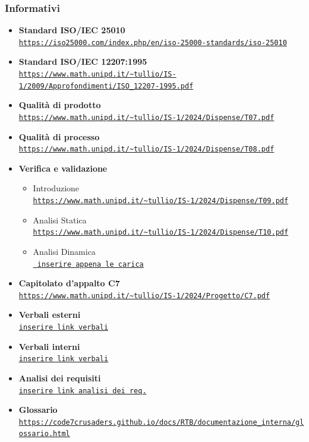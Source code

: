 \documentclass{article}
\begin{document}
\subsubsection{Informativi}
\begin{itemize}
    \item \textbf{Standard ISO/IEC 25010} \\ \texttt{\url{https://iso25000.com/index.php/en/iso-25000-standards/iso-25010}}
    \item \textbf{Standard ISO/IEC 12207:1995} \\ \texttt{\url{https://www.math.unipd.it/~tullio/IS-1/2009/Approfondimenti/ISO_12207-1995.pdf}}
    \item \textbf{Qualità di prodotto} \\ \texttt{\url{https://www.math.unipd.it/~tullio/IS-1/2024/Dispense/T07.pdf}}
    \item \textbf{Qualità di processo} \\ \texttt{\url{https://www.math.unipd.it/~tullio/IS-1/2024/Dispense/T08.pdf}}
    \item \textbf{Verifica e validazione}
    \begin{itemize}
        \item Introduzione \\ \texttt{\url{https://www.math.unipd.it/~tullio/IS-1/2024/Dispense/T09.pdf}}
        \item Analisi Statica \\ \texttt{\url{https://www.math.unipd.it/~tullio/IS-1/2024/Dispense/T10.pdf}}
        \item Analisi Dinamica \\ \texttt{\url{ inserire appena le carica}}
    \end{itemize}
    \item \textbf{Capitolato d'appalto C7} \\ \texttt{\url{https://www.math.unipd.it/~tullio/IS-1/2024/Progetto/C7.pdf}}
    \item \textbf{Verbali esterni} \\ \texttt{\url{inserire link verbali}}
    \item \textbf{Verbali interni} \\ \texttt{\url{inserire link verbali}}
    \item \textbf{Analisi dei requisiti} \\ \texttt{\url{inserire link analisi dei req.}}
    \item \textbf{Glossario} \\ \texttt{\url{https://code7crusaders.github.io/docs/RTB/documentazione_interna/glossario.html}}
\end{itemize}
\end{document}
